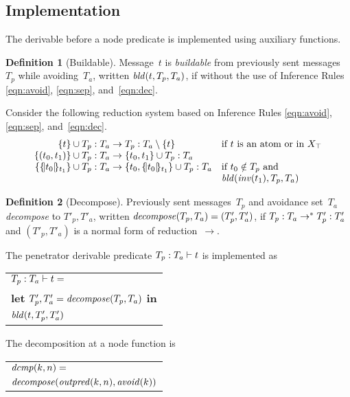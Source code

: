 \documentclass[12pt]{article}
\theoremstyle{definition}
\newtheorem{defn}{Definition}[section]
\begin{document}
\subsection{Implementation}\label{sec:derivable implementation}

The derivable before a node predicate is implemented using auxiliary
functions.

\begin{defn}[Buildable]
Message~$t$ is \emph{buildable} from previously sent messages~$T_p$
while avoiding~$T_a$, written $\fn{bld}(t,T_p,T_a)$, if
 without the use of Inference Rules \ref{eqn:avoid},
\ref{eqn:sep}, and~\ref{eqn:dec}.
\end{defn}

Consider the following reduction system based on Inference Rules
\ref{eqn:avoid}, \ref{eqn:sep}, and~\ref{eqn:dec}.
$$\begin{array}{r@{}c@{}ll}
\dctx{\{t\}\cup T_p}{T_a}&{}\to{}&\dctx{T_p}{T_a}\setminus\{t\}
&\mbox{if $t$ is an atom or in $X_{\top}$}\\
\dctx{\{(t_0,t_1)\}\cup T_p}{T_a}&{}\to{}&\dctx{\{t_0,t_1\}\cup T_p}{T_a}\\
\dctx{\{\enc{t_0}{t_1}\}\cup
T_p}{T_a}&{}\to{}&\dctx{\{t_0,\enc{t_0}{t_1}\}\cup T_p}{T_a}
&\mbox{if $t_0\notin T_p$ and}\\
&&&\fn{bld}(\fn{inv}(t_1),T_p,T_a)
\end{array}$$

\begin{defn}[Decompose]
Previously sent messages~$T_p$ and avoidance set~$T_a$
\emph{decompose} to $T'_p,T'_a$, written
$\fn{decompose}(T_p,T_a)=(T'_p,T'_a)$, if
$\dctx{T_p}{T_a}\to^\ast\dctx{T'_p}{T'_a}$
and $(T'_p,T'_a)$ is a normal form of reduction~$\to$.
\end{defn}

The penetrator derivable predicate $\der{t}{T_p}{T_a}$ is implemented as
\begin{center}
\begin{tabular}{l}
$\der{t}{T_p}{T_a}={}$\\
\quad\textbf{let} $T'_p, T'_a=\fn{decompose}(T_p,T_a)$ \textbf{in}\\
\quad$\fn{bld}(t,T'_p,T'_a)$
\end{tabular}
\end{center}

The decomposition at a node function is
\begin{center}
\begin{tabular}{l}
$\fn{dcmp}(k,n)={}$\\
\quad$\fn{decompose}(\fn{outpred}(k,n),\fn{avoid}(k))$
\end{tabular}
\end{center}
\end{document}
